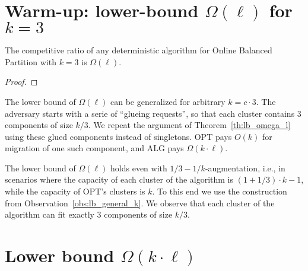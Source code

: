 \section{Warm-up: lower-bound $\Omega(\ell)$ for $k=3$}


\begin{theorem}
  The competitive ratio of any deterministic algorithm for Online Balanced Partition with $k=3$ is $\Omega(\ell)$.
  \label{th:lb_omega_l}
\end{theorem}

\begin{proof}
\end{proof}

\begin{observation}
  The lower bound of $\Omega(\ell)$ can be generalized for arbitrary $k = c\cdot 3$.
  The adversary starts with a serie of ``glueing requests'', so that each cluster contains 3 components of size $k/3$.
  We repeat the argument of Theorem~\ref{th:lb_omega_l} using these glued components instead of singletons.
  OPT pays $O(k)$ for migration of one such component, and ALG pays $\Omega(k \cdot \ell)$.
  \label{obs:lb_general_k}
\end{observation}

\begin{observation}
  The lower bound of $\Omega(\ell)$ holds even with $1/3-1/k$-augmentation, i.e., in scenarios where the capacity of each cluster of the algorithm is $(1+1/3)\cdot k - 1$, while the capacity of OPT's clusters is $k$.
  To this end we use the construction from Observation~\ref{obs:lb_general_k}.
  We observe that each cluster of the algorithm can fit exactly $3$ components of size $k/3$.
\end{observation}




\section{Lower bound $\Omega(k\cdot \ell)$}


